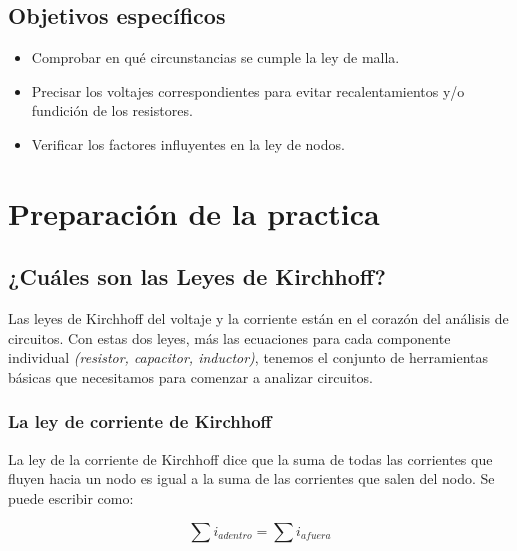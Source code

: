 \documentclass[twocolumn, 12pt]{article}
\begin{document}
\subsection*{Objetivos específicos}

\begin{itemize}[label=$\triangleright$]
	\item Comprobar en qué circunstancias se cumple la ley de malla.
	\item Precisar los voltajes correspondientes para evitar
	      recalentamientos y/o fundición de los resistores.
	\item Verificar los factores influyentes en la ley de nodos.
\end{itemize}

\section{Preparación de la practica}

\subsection*{¿Cuáles son las Leyes de Kirchhoff?}

\nocite{KhanAcademy}

Las leyes de Kirchhoff del voltaje y la corriente están en
el corazón del análisis de circuitos. Con estas dos leyes,
más las ecuaciones para cada componente individual
\textit{(resistor, capacitor, inductor)}, tenemos el
conjunto de herramientas básicas que necesitamos para
comenzar a analizar circuitos.

\subsubsection*{La ley de corriente de Kirchhoff}

La ley de la corriente de Kirchhoff dice que la suma de
todas las corrientes que fluyen hacia un nodo es igual a la
suma de las corrientes que salen del nodo. Se puede
escribir como:

{\Large
\begin{equation}
	\sum i_{adentro} = \sum i_{afuera}
\end{equation}

}

\end{document}
